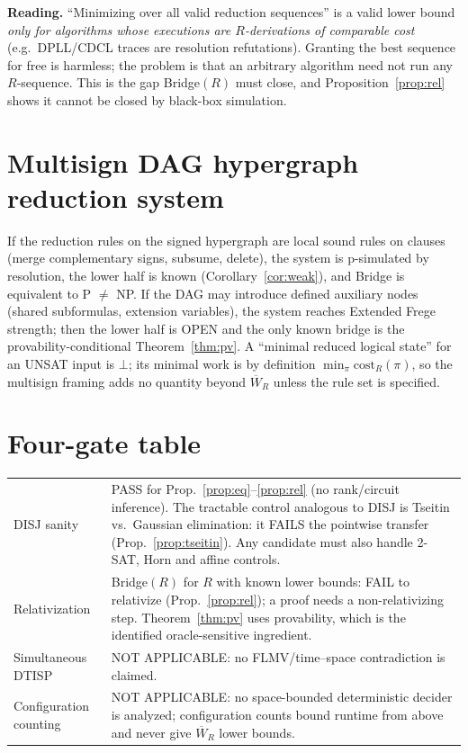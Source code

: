 \documentclass[11pt]{article}
\theoremstyle{remark}
\newcommand{\Wbar}{\overline{W}}
\begin{document}
\noindent\textbf{Reading.} ``Minimizing over all valid reduction sequences'' is a valid lower
bound \emph{only for algorithms whose executions are $R$-derivations of comparable cost}
(e.g.\ DPLL/CDCL traces are resolution refutations). Granting the best sequence for free
is harmless; the problem is that an arbitrary algorithm need not run any $R$-sequence. This is
the gap Bridge$(R)$ must close, and Proposition~\ref{prop:rel} shows it cannot be closed by
black-box simulation.

\section{Multisign DAG hypergraph reduction system}
If the reduction rules on the signed hypergraph are local sound rules on clauses (merge
complementary signs, subsume, delete), the system is p-simulated by resolution, the lower
half is known (Corollary~\ref{cor:weak}), and Bridge is equivalent to P $\neq$ NP. If the DAG
may introduce defined auxiliary nodes (shared subformulas, extension variables), the system
reaches Extended Frege strength; then the lower half is OPEN and the only known bridge is the
provability-conditional Theorem~\ref{thm:pv}. A ``minimal reduced logical state'' for an UNSAT
input is $\bot$; its minimal work is by definition $\min_\pi\mathrm{cost}_R(\pi)$, so the
multisign framing adds no quantity beyond $\Wbar_R$ unless the rule set is specified.

\section{Four-gate table}
\begin{tabular}{p{3.2cm}p{11.5cm}}
\toprule
DISJ sanity & PASS for Prop.~\ref{prop:eq}--\ref{prop:rel} (no rank/circuit inference). The tractable
control analogous to DISJ is Tseitin vs.\ Gaussian elimination: it FAILS the pointwise transfer
(Prop.~\ref{prop:tseitin}). Any candidate must also handle 2-SAT, Horn and affine controls.\\
Relativization & Bridge$(R)$ for $R$ with known lower bounds: FAIL to relativize (Prop.~\ref{prop:rel});
a proof needs a non-relativizing step. Theorem~\ref{thm:pv} uses provability, which is the
identified oracle-sensitive ingredient.\\
Simultaneous DTISP & NOT APPLICABLE: no FLMV/time--space contradiction is claimed.\\
Configuration counting & NOT APPLICABLE: no space-bounded deterministic decider is analyzed;
configuration counts bound runtime from above and never give $\Wbar_R$ lower bounds.\\
\bottomrule
\end{tabular}
\end{document}
